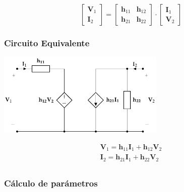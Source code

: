 \[
  \left[
    \begin{array}{c}
      \mathbf{V}_1\\
      \mathbf{I}_2
    \end{array}
  \right] =
  \left[
    \begin{array}{cc}
      \mathbf{h}_{11} & \mathbf{h}_{12}\\
      \mathbf{h}_{21} & \mathbf{h}_{22}
    \end{array}
  \right] \cdot
  \left[
    \begin{array}{c}
      \mathbf{I}_1\\
      \mathbf{V}_2
    \end{array}
  \right]
\]

\subsubsection{Circuito Equivalente}
\label{sec:org18f3f5d}
\begin{center}
\includegraphics[height=4cm]{../figs/circuitoEquivalenteH.pdf}
\end{center}

\[
\begin{array}{l}
  \mathbf{V}_1 = \mathbf{h}_{11} \mathbf{I}_1 + \mathbf{h}_{12} \mathbf{V}_2\\
  \mathbf{I}_2 = \mathbf{h}_{21} \mathbf{I}_1 + \mathbf{h}_{22} \mathbf{V}_2\\
\end{array}
\]

\subsubsection{Cálculo de parámetros}
\label{sec:org2210706}

